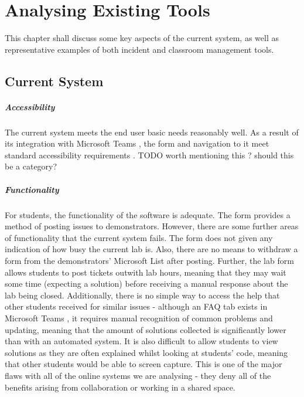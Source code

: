 \chapter{Analysing Existing Tools}

This chapter shall discuss some key aspects of the current system, as well as representative examples of both incident and classroom management tools.

\section{Current System}

\paragraph{Accessibility}
The current system meets the end user basic needs reasonably well. As a result of its integration with Microsoft Teams \cite{teams}, the form and navigation to it meet standard accessibility requirements \cite{formaccess} \cite{teamsaccess}. TODO worth mentioning this ? should this be a category?


\paragraph{Functionality}
For students, the functionality of the software is adequate. The form provides a method of posting issues to demonstrators. However, there are some further areas of functionality that the current system fails. The form does not given any indication of how busy the current lab is. Also, there are no means to withdraw a form from the demonstrators' Microsoft List after posting. Further, the lab form allows students to post tickets outwith lab hours, meaning that they may wait some time (expecting a solution) before receiving a manual response about the lab being closed. Additionally, there is no simple way to access the help that other students received for similar issues - although an FAQ tab exists in Microsoft Teams \cite{teams}, it requires manual recognition of common problems and updating, meaning that the amount of solutions collected is significantly lower than with an automated system. It is also difficult to allow students to view solutions as they are often explained whilst looking at students' code, meaning that other students would be able to screen capture. This is one of the major flaws with all of the online systems we are analysing - they deny all of the benefits arising from collaboration or working in a shared space.
        
